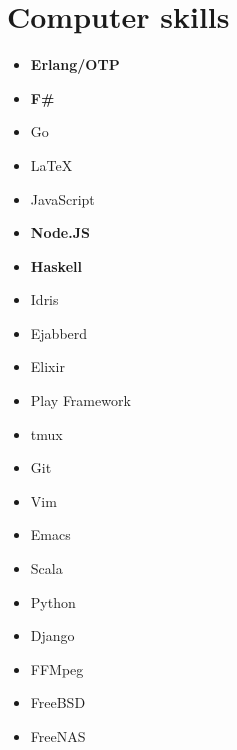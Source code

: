 \documentclass[11pt,a4paper,roman,english]{moderncv}        %
\begin{document}



\makecvtitle
\section{Computer skills}
\begin{multicols}{4}
	\begin{itemize}
		\item[] \textbf{Erlang/OTP}
		\item[] \textbf{F\#}
		\item[] Go
		\item[] \LaTeX
		\item[] JavaScript
		\item[] \textbf{Node.JS}
		\item[] \textbf{Haskell}
	        \item[] Idris
		\item[] Ejabberd
		\item[] Elixir
		\item[] Play Framework
		\item[] tmux
		\item[] Git
		\item[] Vim
		\item[] Emacs
		\item[] Scala
		\item[] Python
		\item[] Django
		\item[] FFMpeg
		\item[] FreeBSD
		\item[] FreeNAS
	\end{itemize}
\end{multicols}
\end{document}
